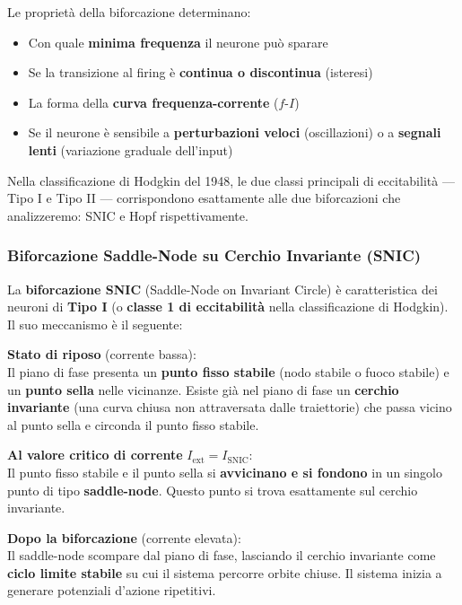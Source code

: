 Le proprietà della biforcazione determinano:
\begin{itemize}
    \item Con quale \textbf{minima frequenza} il neurone può sparare
    \item Se la transizione al firing è \textbf{continua o discontinua} (isteresi)
    \item La forma della \textbf{curva frequenza-corrente} ($f$-$I$)
    \item Se il neurone è sensibile a \textbf{perturbazioni veloci} (oscillazioni) o a \textbf{segnali lenti} (variazione graduale dell'input)
\end{itemize}

Nella classificazione di Hodgkin del 1948, le due classi principali di eccitabilità — Tipo I e Tipo II — corrispondono esattamente alle due biforcazioni che analizzeremo: SNIC e Hopf rispettivamente.

\subsubsection{Biforcazione Saddle-Node su Cerchio Invariante (SNIC)}

La \textbf{biforcazione SNIC} (Saddle-Node on Invariant Circle) è caratteristica dei neuroni di \textbf{Tipo I} (o \textbf{classe 1 di eccitabilità} nella classificazione di Hodgkin). Il suo meccanismo è il seguente:

\textbf{Stato di riposo} (corrente bassa):\\
Il piano di fase presenta un \textbf{punto fisso stabile} (nodo stabile o fuoco stabile) e un \textbf{punto sella} nelle vicinanze. Esiste già nel piano di fase un \textbf{cerchio invariante} (una curva chiusa non attraversata dalle traiettorie) che passa vicino al punto sella e circonda il punto fisso stabile.

\textbf{Al valore critico di corrente} $I_{\text{ext}} = I_{\text{SNIC}}$:\\
Il punto fisso stabile e il punto sella si \textbf{avvicinano e si fondono} in un singolo punto di tipo \textbf{saddle-node}. Questo punto si trova esattamente sul cerchio invariante.

\textbf{Dopo la biforcazione} (corrente elevata):\\
Il saddle-node scompare dal piano di fase, lasciando il cerchio invariante come \textbf{ciclo limite stabile} su cui il sistema percorre orbite chiuse. Il sistema inizia a generare potenziali d'azione ripetitivi.

